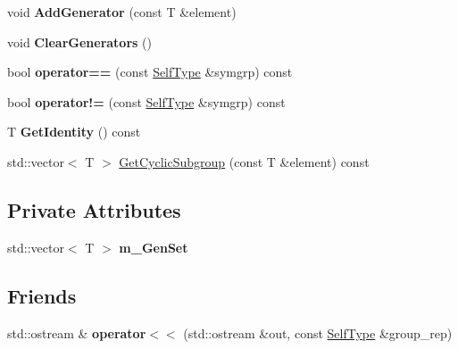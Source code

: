 \begin{DoxyCompactItemize}
\item 
\hypertarget{classcSymmetricRep_a59125541fe5801e2073cacb54ed879d8}{void {\bfseries \-Add\-Generator} (const \-T \&element)}\label{classcSymmetricRep_a59125541fe5801e2073cacb54ed879d8}

\item 
\hypertarget{classcSymmetricRep_a37c8cab52b7ef4aa4b83f3ef203036ef}{void {\bfseries \-Clear\-Generators} ()}\label{classcSymmetricRep_a37c8cab52b7ef4aa4b83f3ef203036ef}

\item 
\hypertarget{classcSymmetricRep_a30639c704b01408475c9fd4a100d738d}{bool {\bfseries operator==} (const \hyperlink{classcSymmetricRep}{\-Self\-Type} \&symgrp) const }\label{classcSymmetricRep_a30639c704b01408475c9fd4a100d738d}

\item 
\hypertarget{classcSymmetricRep_a77bcf4f11ff92c57aa6626c075bf3355}{bool {\bfseries operator!=} (const \hyperlink{classcSymmetricRep}{\-Self\-Type} \&symgrp) const }\label{classcSymmetricRep_a77bcf4f11ff92c57aa6626c075bf3355}

\item 
\hypertarget{classcSymmetricRep_a5182c5dcf4247c03a7e0de001e7c1cf3}{\-T {\bfseries \-Get\-Identity} () const }\label{classcSymmetricRep_a5182c5dcf4247c03a7e0de001e7c1cf3}

\item 
std\-::vector$<$ \-T $>$ \hyperlink{classcSymmetricRep_ad8420870de49c97154a4afd71752c071}{\-Get\-Cyclic\-Subgroup} (const \-T \&element) const 
\end{DoxyCompactItemize}
\subsection*{\-Private \-Attributes}
\begin{DoxyCompactItemize}
\item 
\hypertarget{classcSymmetricRep_ab9afa5a928d6fba3c560e0245ab5d0e4}{std\-::vector$<$ \-T $>$ {\bfseries m\-\_\-\-Gen\-Set}}\label{classcSymmetricRep_ab9afa5a928d6fba3c560e0245ab5d0e4}

\end{DoxyCompactItemize}
\subsection*{\-Friends}
\begin{DoxyCompactItemize}
\item 
\hypertarget{classcSymmetricRep_ad73abea0c910e6d44cac98fd4bc1a8a8}{std\-::ostream \& {\bfseries operator$<$$<$} (std\-::ostream \&out, const \hyperlink{classcSymmetricRep}{\-Self\-Type} \&group\-\_\-rep)}\label{classcSymmetricRep_ad73abea0c910e6d44cac98fd4bc1a8a8}

\end{DoxyCompactItemize}



